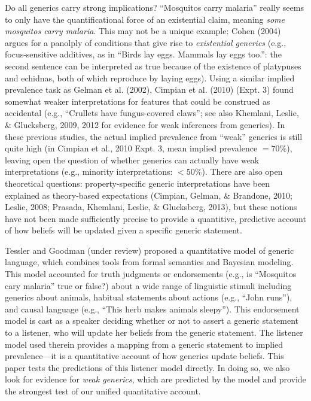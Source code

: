 \documentclass[floatsintext,doc]{apa6}
\theoremstyle{definition}
\theoremstyle{definition}
\theoremstyle{definition}
\theoremstyle{remark}
\begin{document}
Do all generics carry strong implications? \enquote{Mosquitos carry
malaria} really seems to only have the quantificational force of an
existential claim, meaning \emph{some mosquitos carry malaria}. This may
not be a unique example: Cohen (2004) argues for a panolply of
conditions that give rise to \emph{existential generics} (e.g.,
focus-sensitive additives, as in \enquote{Birds lay eggs. Mammals lay
eggs too.}: the second sentence can be interpreted as true because of
the existence of platypuses and echidnas, both of which reproduce by
laying eggs). Using a similar implied prevalence task as Gelman et al.
(2002), Cimpian et al. (2010) (Expt. 3) found somewhat weaker
interpretations for features that could be construed as accidental
(e.g., ``Crullets have fungus-covered claws''; see also Khemlani,
Leslie, \& Glucksberg, 2009, 2012 for evidence for weak inferences from
generics). 
In these
previous studies, the actual implied prevalence from \enquote{weak}
generics is still quite high (in Cimpian et al., 2010 Expt. 3, mean
implied prevalence \(= 70\%\)), leaving open the question of whether
generics can actually have weak interpretations (e.g., minority
interpretations: \(< 50\%\)).
There are also open theoretical questions:
property-specific generic interpretations have been explained as
theory-based expectations (Cimpian, Gelman, \& Brandone, 2010; Leslie,
2008; Prasada, Khemlani, Leslie, \& Glucksberg, 2013), but these notions
have not been made sufficiently precise to provide a quantitive,
predictive account of how beliefs will be updated given a specific generic statement. 

Tessler and Goodman (under review) proposed a quantitative model of
generic language, which combines tools from formal semantics and Bayesian modeling. 
This model accounted for truth judgments or endorsements (e.g., is
\enquote{Mosquitos cary malaria} true or false?) about a wide range of
linguistic stimuli including generics about animals, habitual statements
about actions (e.g., \enquote{John runs}), and causal language (e.g.,
\enquote{This herb makes animals sleepy}). This endorsement model is
cast as a speaker deciding whether or not to assert a generic statement to
a listener, who will update her beliefs from the generic
statement. The listener model used therein provides a mapping from a
generic statement to implied prevalence---it is a quantitative account
of how generics update beliefs. This paper tests the predictions of this listener
model directly. In doing so, we also look for evidence for \emph{weak generics},
which are predicted by the model and provide the strongest test of our unified quantitative account.
\end{document}
